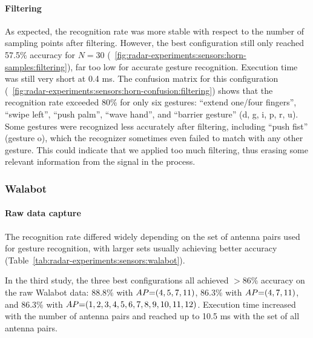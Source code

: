 \paragraph{Filtering}
As expected, the recognition rate was more stable with respect to the number of sampling points after filtering. However, the best configuration still only reached 57.5\% accuracy for $N{=}30$ (\fig~\ref{fig:radar-experiments:sensors:horn-samples:filtering}), far too low for accurate gesture recognition. 
Execution time was still very short at 0.4 ms. 
The confusion matrix for this configuration (\fig~\ref{fig:radar-experiments:sensors:horn-confusion:filtering}) shows that the recognition rate exceeded 80\% for only six gestures: ``extend one/four fingers'', ``swipe left'', ``push palm'', ``wave hand'', and ``barrier gesture'' (d, g, i, p, r, u). 
%
Some gestures were recognized less accurately after filtering, including ``push fist'' (gesture o), which the recognizer sometimes even failed to match with any other gesture. This could indicate that we applied too much filtering, thus erasing some relevant information from the signal in the process.






\subsubsection{Walabot} \label{sec:radar-experiments:sensors:results:walabot}


\paragraph{Raw data capture}
The recognition rate differed widely depending on the set of antenna pairs used for gesture recognition, with larger sets usually achieving better accuracy (Table~\ref{tab:radar-experiments:sensors:walabot}). 

In the third study, the three best configurations all achieved ${>}86\%$ accuracy on the raw Walabot data: 88.8\% with $\splitatcommas{AP{=}(4, 5, 7, 11)}$, 86.3\% with $\splitatcommas{AP{=}(4, 7, 11)}$, and 86.3\% with $\splitatcommas{AP{=}(1,2,3,4,5,6,7,8,9,10,11,12)}$. Execution time increased with the number of antenna pairs and reached up to 10.5 ms with the set of all antenna pairs. 

